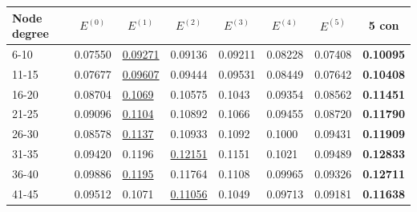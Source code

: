 \begin{table}[]
    \centering
    \begin{tabular}{|l|l|l|l|l|l|l||l|}
        \hline
        Node degree & \multicolumn{1}{c|}{$E^{(0)}$} & \multicolumn{1}{c|}{$E^{(1)}$} & \multicolumn{1}{c|}{$E^{(2)}$} & \multicolumn{1}{c|}{$E^{(3)}$} & \multicolumn{1}{c|}{$E^{(4)}$} & \multicolumn{1}{c||}{$E^{(5)}$} & \multicolumn{1}{c|}{5 con} \\ \hline
        6-10        & 0.07550                        & \underline{0.09271}            & 0.09136                        & 0.09211                        & 0.08228                        & 0.07408                         & \textbf{0.10095}           \\ \hline
        11-15       & 0.07677                        & \underline{0.09607}            & 0.09444                        & 0.09531                        & 0.08449                        & 0.07642                         & \textbf{0.10408}           \\ \hline
        16-20       & 0.08704                        & \underline{0.1069}             & 0.10575                        & 0.1043                         & 0.09354                        & 0.08562                         & \textbf{0.11451}           \\ \hline
        21-25       & 0.09096                        & \underline{0.1104}             & 0.10892                        & 0.1066                         & 0.09455                        & 0.08720                         & \textbf{0.11790}           \\ \hline
        26-30       & 0.08578                        & \underline{0.1137}             & 0.10933                        & 0.1092                         & 0.1000                         & 0.09431                         & \textbf{0.11909}           \\ \hline
        31-35       & 0.09420                        & 0.1196                         & \underline{0.12151}            & 0.1151                         & 0.1021                         & 0.09489                         & \textbf{0.12833}           \\ \hline
        36-40       & 0.09886                        & \underline{0.1195}             & 0.11764                        & 0.1108                         & 0.09965                        & 0.09326                         & \textbf{0.12711}           \\ \hline
        41-45       & 0.09512                        & 0.1071                         & \underline{0.11056}            & 0.1049                         & 0.09713                        & 0.09181                         & \textbf{0.11638}           \\ \hline

\end{tabular}
\end{table}
